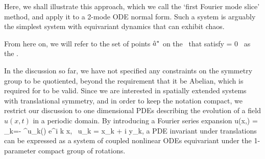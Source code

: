 Here, we shall illustrate this approach, which we call the
`first Fourier mode slice' method, and apply it to a 2-mode ODE normal form. Such
a system is arguably the simplest system with  equivariant dynamics that
can exhibit chaos.

From here on, we will refer to the set of points $\hat{a}^*$ on the \slicePlane\ that satisfy
\beq
\braket{\groupTan(\sspRed^*)}{\sliceTan{}} = 0
\,
as the \emph{\sliceBord}.

In the discussion so far, we have not specified any constraints on the symmetry group
to be quotiented, beyond the requirement that it be Abelian, which is required for 
to be valid.
Since we are interested in spatially extended systems with
translational symmetry, and in order to keep the notation compact,
we restrict our discussion to one dimensional PDEs describing
the evolution of a field $u(x,t)$ in a periodic domain.
By introducing a Fourier series expansion
\beq
	u(x,\zeit) = \sum\limits_{k=- \infty}^\infty u_k\left(\zeit\right) e^{i k x}, \,\,\,u_k = x_k + i y_k,
a PDE invariant under translations can be expressed as a system of coupled nonlinear
ODEs equivariant under the 1-parameter compact group of  rotations.


